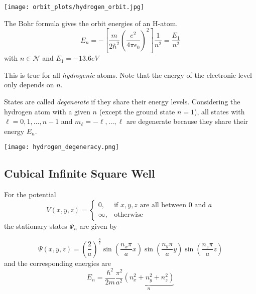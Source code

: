 \begin{center}
    \texttt{[image: orbit\_plots/hydrogen\_orbit.jpg]}
\end{center}

\newpar{}

The Bohr formula gives the orbit energies of an H-atom.
\begin{equation*}
    E_n = -\left[\frac{m}{2\hbar^2}{\left(\frac{e^2}{4\pi\epsilon_0}\right)}^2\right]\frac{1}{n^2} = \frac{E_1}{n^2}
\end{equation*}
with $n \in \mathcal{N}$ and $E_1 = -13.6eV$

This is true for all \textit{hydrogenic} atoms. Note that the energy of the electronic level only depends on $n$.

\newpar{}

States are called \textit{degenerate} if they share their energy levels.
Considering the hydrogen atom with a given $n$ (except the ground state $n=1$), all states with $\ell=0,1,\ldots, n-1$ and $m_\ell=-\ell, \ldots, \ell$ are degenerate because they share their energy $E_n$.
\begin{center}
    \texttt{[image: hydrogen\_degeneracy.png]}
\end{center}

\subsection{Cubical Infinite Square Well}
For the potential
\noindent\begin{equation*}
    V(x,y,z)=\begin{cases}0,&\text{if }x,y,z\text{ are all between }0\text{ and }a\\\infty,&\text{otherwise}\end{cases}
\end{equation*}
the stationary states $\Psi_n$ are given by

\noindent\begin{equation*}
    \Psi \left(x,y,z\right)={\left(\frac{2}{a}\right)}^{\frac{3}{2}} \sin\left(\frac{n_{x}\pi}{a}x\right)\sin\left(\frac{n_{y}\pi}{a}y\right)\sin\left(\frac{n_{z}\pi}{a}z\right)
\end{equation*}
and the corresponding energies are
\noindent\begin{equation*}
    E_n = \frac{\hbar^{2}}{2m} \frac{\pi^{2}}{a^{2}} \underbrace{\left(n_{x}^{2}+n_{y}^{2}+n_{z}^{2}\right)}_{n}
\end{equation*}

